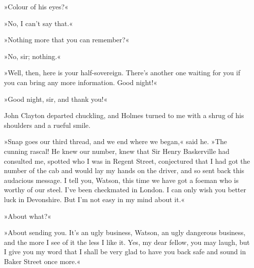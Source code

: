 »Colour of his eyes?«

»No, I can't say that.«

»Nothing more that you can remember?«

»No, sir; nothing.«

»Well, then, here is your half-sovereign. There's another one waiting for you if you can bring any more information. Good night!«

»Good night, sir, and thank you!«

John Clayton departed chuckling, and Holmes turned to me with a shrug of his shoulders and a rueful smile.

»Snap goes our third thread, and we end where we began,« said he. »The cunning rascal! He knew our number, knew that Sir Henry Baskerville had consulted me, spotted who I was in Regent Street, conjectured that I had got the number of the cab and would lay my hands on the driver, and so sent back this audacious message. I tell you, Watson, this time we have got a foeman who is worthy of our steel. I've been checkmated in London. I can only wish you better luck in Devonshire. But I'm not easy in my mind about it.«

»About what?«

»About sending you. It's an ugly business, Watson, an ugly dangerous business, and the more I see of it the less I like it. Yes, my dear fellow, you may laugh, but I give you my word that I shall be very glad to have you back safe and sound in Baker Street once more.«
